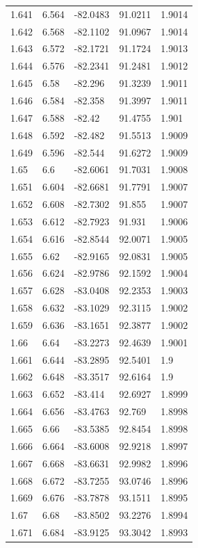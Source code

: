 \begin{tabular}{lllll}
1.641 & 6.564 & -82.0483 & 91.0211 & 1.9014 \\
1.642 & 6.568 & -82.1102 & 91.0967 & 1.9014 \\
1.643 & 6.572 & -82.1721 & 91.1724 & 1.9013 \\
1.644 & 6.576 & -82.2341 & 91.2481 & 1.9012 \\
1.645 & 6.58 & -82.296 & 91.3239 & 1.9011 \\
1.646 & 6.584 & -82.358 & 91.3997 & 1.9011 \\
1.647 & 6.588 & -82.42 & 91.4755 & 1.901 \\
1.648 & 6.592 & -82.482 & 91.5513 & 1.9009 \\
1.649 & 6.596 & -82.544 & 91.6272 & 1.9009 \\
1.65 & 6.6 & -82.6061 & 91.7031 & 1.9008 \\
1.651 & 6.604 & -82.6681 & 91.7791 & 1.9007 \\
1.652 & 6.608 & -82.7302 & 91.855 & 1.9007 \\
1.653 & 6.612 & -82.7923 & 91.931 & 1.9006 \\
1.654 & 6.616 & -82.8544 & 92.0071 & 1.9005 \\
1.655 & 6.62 & -82.9165 & 92.0831 & 1.9005 \\
1.656 & 6.624 & -82.9786 & 92.1592 & 1.9004 \\
1.657 & 6.628 & -83.0408 & 92.2353 & 1.9003 \\
1.658 & 6.632 & -83.1029 & 92.3115 & 1.9002 \\
1.659 & 6.636 & -83.1651 & 92.3877 & 1.9002 \\
1.66 & 6.64 & -83.2273 & 92.4639 & 1.9001 \\
1.661 & 6.644 & -83.2895 & 92.5401 & 1.9 \\
1.662 & 6.648 & -83.3517 & 92.6164 & 1.9 \\
1.663 & 6.652 & -83.414 & 92.6927 & 1.8999 \\
1.664 & 6.656 & -83.4763 & 92.769 & 1.8998 \\
1.665 & 6.66 & -83.5385 & 92.8454 & 1.8998 \\
1.666 & 6.664 & -83.6008 & 92.9218 & 1.8997 \\
1.667 & 6.668 & -83.6631 & 92.9982 & 1.8996 \\
1.668 & 6.672 & -83.7255 & 93.0746 & 1.8996 \\
1.669 & 6.676 & -83.7878 & 93.1511 & 1.8995 \\
1.67 & 6.68 & -83.8502 & 93.2276 & 1.8994 \\
1.671 & 6.684 & -83.9125 & 93.3042 & 1.8993 \\

\end{tabular}
